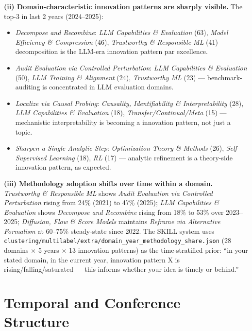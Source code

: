 \documentclass[10pt,a4paper]{article}
\begin{document}
\textbf{(ii) Domain-characteristic innovation patterns are sharply visible.} The top-3 in last 2 years (2024--2025):
\begin{itemize}[leftmargin=1.4em, topsep=2pt, itemsep=2pt]
\item \emph{Decompose and Recombine}: \textit{LLM Capabilities \& Evaluation} (63), \textit{Model Efficiency \& Compression} (46), \textit{Trustworthy \& Responsible ML} (41) --- decomposition is the LLM-era innovation pattern par excellence.
\item \emph{Audit Evaluation via Controlled Perturbation}: \textit{LLM Capabilities \& Evaluation} (50), \textit{LLM Training \& Alignment} (24), \textit{Trustworthy ML} (23) --- benchmark-auditing is concentrated in LLM evaluation domains.
\item \emph{Localize via Causal Probing}: \textit{Causality, Identifiability \& Interpretability} (28), \textit{LLM Capabilities \& Evaluation} (18), \textit{Transfer/Continual/Meta} (15) --- mechanistic interpretability is becoming a innovation pattern, not just a topic.
\item \emph{Sharpen a Single Analytic Step}: \textit{Optimization Theory \& Methods} (26), \textit{Self-Supervised Learning} (18), \textit{RL} (17) --- analytic refinement is a theory-side innovation pattern, as expected.
\end{itemize}

\textbf{(iii) Methodology adoption shifts over time within a domain.} \textit{Trustworthy \& Responsible ML} shows \emph{Audit Evaluation via Controlled Perturbation} rising from 24\% (2021) to 47\% (2025); \textit{LLM Capabilities \& Evaluation} shows \emph{Decompose and Recombine} rising from 18\% to 53\% over 2023--2025; \textit{Diffusion, Flow \& Score Models} maintains \emph{Reframe via Alternative Formalism} at 60--75\% steady-state since 2022. The SKILL system uses \texttt{clustering/multilabel/extra/domain\_year\_methodology\_share.json} (28 domains \(\times\) 5 years \(\times\) 13 innovation patterns) as the time-stratified prior: ``in your stated domain, in the current year, innovation pattern X is rising/falling/saturated --- this informs whether your idea is timely or behind.''

\section{Temporal and Conference Structure}
\label{sec:trends}
\end{document}
